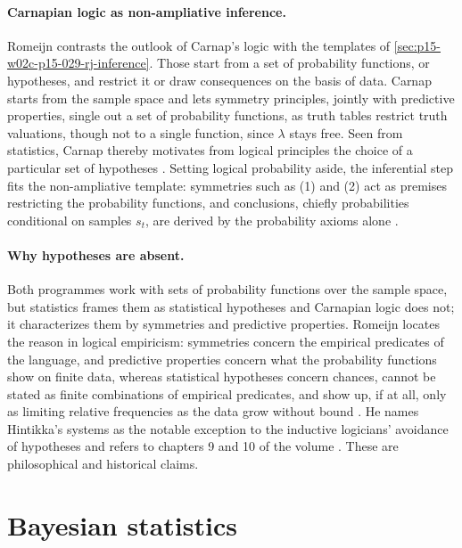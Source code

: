 \paragraph{Carnapian logic as non-ampliative inference.}
Romeijn contrasts the outlook of Carnap's logic with the templates of
\cref{sec:p15-w02c-p15-029-rj-inference}. Those start from a set of
probability functions, or hypotheses, and restrict it or draw
consequences on the basis of data. Carnap starts from the sample space
and lets symmetry principles, jointly with predictive properties,
single out a set of probability functions, as truth tables restrict truth valuations,
though not to a single function, since \(\lambda\) stays free. Seen
from statistics, Carnap thereby motivates from logical principles the
choice of a particular set of hypotheses
\cite[pp.~631--632]{Romeijn2011InductiveLogicStatistics}. Setting
logical probability aside, the inferential step fits the non-ampliative
template: symmetries such as (1) and (2) act as premises restricting the
probability functions, and conclusions, chiefly probabilities
conditional on samples \(s_t\), are derived by the probability axioms
alone \cite[p.~632]{Romeijn2011InductiveLogicStatistics}.

\paragraph{Why hypotheses are absent.}
Both programmes work with sets of probability functions over the sample
space, but statistics frames them as statistical hypotheses and
Carnapian logic does not; it characterizes them by symmetries and
predictive properties. Romeijn locates the reason in logical
empiricism: symmetries concern the empirical predicates of the
language, and predictive properties concern what the probability
functions show on finite data, whereas statistical hypotheses concern
chances, cannot be stated as finite combinations of empirical
predicates, and show up, if at all, only as limiting relative
frequencies as the data grow without bound
\cite[p.~632]{Romeijn2011InductiveLogicStatistics}. He names Hintikka's
systems as the notable exception to the inductive logicians' avoidance
of hypotheses and refers to chapters 9 and 10 of the volume
\cite[p.~632]{Romeijn2011InductiveLogicStatistics}. These are
philosophical and historical claims.

\section{Bayesian statistics}
\label{sec:p15-w02c-p15-029-rj-bayes}

